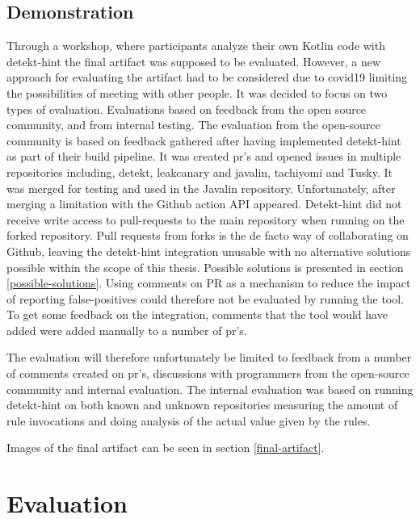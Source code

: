 \documentclass{report}
\begin{document}
\subsection{Demonstration}

Through a workshop, where participants analyze their own Kotlin code with detekt-hint the final artifact was supposed to be evaluated. However, a new approach for evaluating the artifact had to be considered due to \gls{covid19} limiting the possibilities of meeting with other people. It was decided to focus on two types of evaluation. Evaluations based on feedback from the open source community, and from internal testing. The evaluation from the open-source community is based on feedback gathered after having implemented detekt-hint as part of their build pipeline. It was created \gls{pr}'s and opened issues in multiple repositories including, detekt\cite{detekt}, leakcanary\cite{leakcanary}  and javalin\cite{javalin}, tachiyomi\cite{tachiyomi} and Tusky\cite{tusky}. It was merged for testing and used in the Javalin repository. Unfortunately, after merging a limitation with the Github action API appeared. Detekt-hint did not receive write access to pull-requests to the main repository when running on the forked repository. Pull requests from forks is the de facto way of collaborating on Github, leaving the detekt-hint integration unusable with no alternative solutions possible within the scope of this thesis. Possible solutions is presented in 
section \ref{possible-solutions}. Using comments on PR as a mechanism to reduce the impact of reporting false-positives could therefore not be evaluated by running the tool. To get some feedback on the integration, comments that the tool would have added were added manually to a number of \gls{pr}'s. 

The evaluation will therefore unfortunately be limited to feedback from a number of comments created on \gls{pr}'s, discussions with programmers from the open-source community and internal evaluation. The internal evaluation was based on running detekt-hint on both known and unknown repositories measuring the amount of rule invocations and doing analysis of the actual value given by the rules. 

Images of the final artifact can be seen in section \ref{final-artifact}.


\section{Evaluation}
\end{document}
